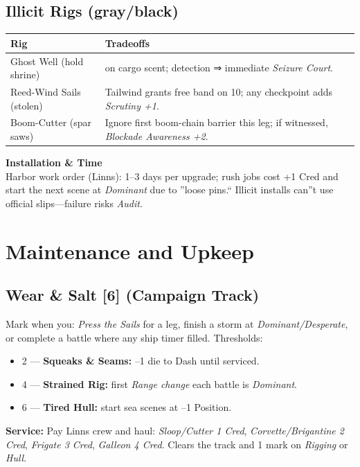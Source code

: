 \documentclass[11pt,oneside]{book}
\newcommand{\tagpill}[1]{\begingroup
  \setlength{\fboxsep}{1pt}\color{black}\fbox{\footnotesize\textsf{#1}}
\endgroup}
\begin{document}
\subsection*{Illicit Rigs (gray/black)}
\begin{tabularx}{\linewidth}{@{}p{3.8cm} X@{}}
\toprule
\textbf{Rig} & \textbf{Tradeoffs}\\
\midrule
Ghost Well (hold shrine) & \tagpill{VEIL} on cargo scent; detection ⇒ immediate \textit{Seizure Court}.\\
Reed-Wind Sails (stolen) & Tailwind grants free band on 10; any checkpoint adds \textit{Scrutiny +1}.\\
Boom-Cutter (spar saws) & Ignore first boom-chain barrier this leg; if witnessed, \textit{Blockade Awareness +2}.\\
\bottomrule
\end{tabularx}

\begin{tcolorbox}[breakable]
\textbf{Installation \& Time}\\
Harbor work order (Linns): 1--3 days per upgrade; rush jobs cost +1 Cred and start the next scene at \emph{Dominant} due to ''loose pins.`` Illicit installs can''t use official slips---failure risks \emph{Audit}.
\end{tcolorbox}

\section{Maintenance and Upkeep}

\subsection*{Wear \& Salt [6] (Campaign Track)}
Mark when you: \emph{Press the Sails} for a leg, finish a storm at \emph{Dominant/Desperate}, or complete a battle where any ship timer filled. Thresholds:
\begin{itemize}
  \item 2 --- \textbf{Squeaks \& Seams:} --1 die to Dash until serviced.
  \item 4 --- \textbf{Strained Rig:} first \emph{Range change} each battle is \emph{Dominant}.
  \item 6 --- \textbf{Tired Hull:} start sea scenes at --1 Position.
\end{itemize}
\noindent \textbf{Service:} Pay Linns crew and haul: \emph{Sloop/Cutter 1 Cred}, \emph{Corvette/Brigantine 2 Cred}, \emph{Frigate 3 Cred}, \emph{Galleon 4 Cred}. Clears the track and 1 mark on \textit{Rigging} or \textit{Hull}.
\end{document}
